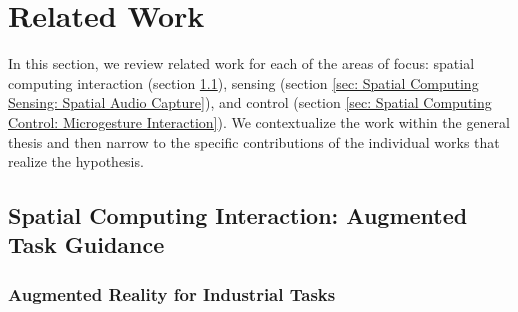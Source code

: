 \documentclass [11pt, proquest] {uwthesis}[2020/02/24]
\begin{document}
 
\chapter{Related Work}
\label{sec:related}

In this section, we review related work for each of the areas of focus: spatial computing interaction (section \ref{sec: Spatial Computing Interaction: Augmented Task Guidance}), sensing (section \ref{sec: Spatial Computing Sensing: Spatial Audio Capture}), and control (section \ref{sec: Spatial Computing Control: Microgesture Interaction}). We contextualize the work within the general thesis and then narrow to the specific contributions of the individual works that realize the hypothesis.

\section{Spatial Computing Interaction: Augmented Task Guidance}
\label{sec: Spatial Computing Interaction: Augmented Task Guidance}

\subsection{Augmented Reality for Industrial Tasks}
\label{subsec: Augmented Reality}
\end{document}
